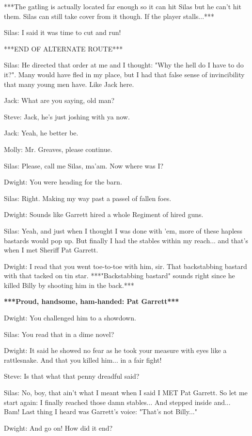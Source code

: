 \documentclass{article}
\begin{document}
***The gatling is actually located far enough so it can hit Silas but he can't hit them. Silas can still take cover from it though. If the player stalls...***

Silas: I said it was time to cut and run!

***END OF ALTERNATE ROUTE***

Silas: He directed that order at me and I thought: "Why the hell do I have to do it?". Many would have fled in my place, but I had that false sense of invincibility that many young men have. Like Jack here.

Jack: What are you saying, old man?

Steve: Jack, he's just joshing with ya now.

Jack: Yeah, he better be.

Molly: Mr. Greaves, please continue.

Silas: Please, call me Silas, ma'am. Now where was I?

Dwight: You were heading for the barn.

Silas: Right. Making my way past a passel of fallen foes.

Dwight: Sounds like Garrett hired a whole Regiment of hired guns.

Silas: Yeah, and just when I thought I was done with 'em, more of these hapless bastards would pop up. But finally I had the stables within my reach... and that's when I met Sheriff Pat Garrett.

Dwight: I read that you went toe-to-toe with him, sir. That backstabbing bastard with that tacked on tin star. ***"Backstabbing bastard" sounds right since he killed Billy by shooting him in the back.***

\textbf{***Proud, handsome, ham-handed: Pat Garrett***}

Dwight: You challenged him to a showdown.

Silas: You read that in a dime novel?

Dwight: It said he showed no fear as he took your measure with eyes like a rattlesnake. And that you killed him... in a fair fight!

Steve: Is that what that penny dreadful said?

Silas: No, boy, that ain't what I meant when I said I MET Pat Garrett. So let me start again: I finally reached those damn stables... And stepped inside and... Bam! Last thing I heard was Garrett's voice: "That's not Billy..."

Dwight: And go on! How did it end?
\end{document}

